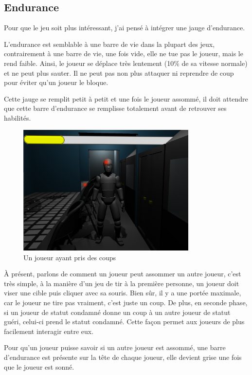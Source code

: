 \documentclass{article}
\begin{document}
\subsection{Endurance}


Pour que le jeu soit plus intéressant, j'ai pensé à intégrer une jauge d'endurance.


L'endurance est semblable à une barre de vie dans la plupart des jeux, contrairement à une barre de vie, une fois vide, elle ne tue pas le joueur, mais le rend faible. Ainsi, le joueur se déplace très lentement (10\% de sa vitesse normale) et ne peut plus sauter. Il ne peut pas non plus attaquer ni reprendre de coup pour éviter qu'un joueur le bloque.


Cette jauge se remplit petit à petit et une fois le joueur assommé, il doit attendre que cette barre d'endurance se remplisse totalement avant de retrouver ses habilités.


\begin{figure}[H]
\centering
\includegraphics[width=0.8\textwidth]{cc/stamina.png}
\caption{Un joueur ayant pris des coups}
\label{cc_a}
\end{figure}


À présent, parlons de comment un joueur peut assommer un autre joueur, c'est très simple, à la manière d'un jeu de tir à la première personne, un joueur doit viser une cible puis cliquer avec sa souris. Bien sûr, il y a une portée maximale, car le joueur ne tire pas vraiment, c'est juste un coup. De plus, en seconde phase, si un joueur de statut condamné donne un coup à un autre joueur de statut guéri, celui-ci prend le statut condamné. Cette façon permet aux joueurs de plus facilement interagir entre eux.


Pour qu'un joueur puisse savoir si un autre joueur est assommé, une barre d'endurance est présente sur la tête de chaque joueur, elle devient grise une fois que le joueur est sonné.
\end{document}
